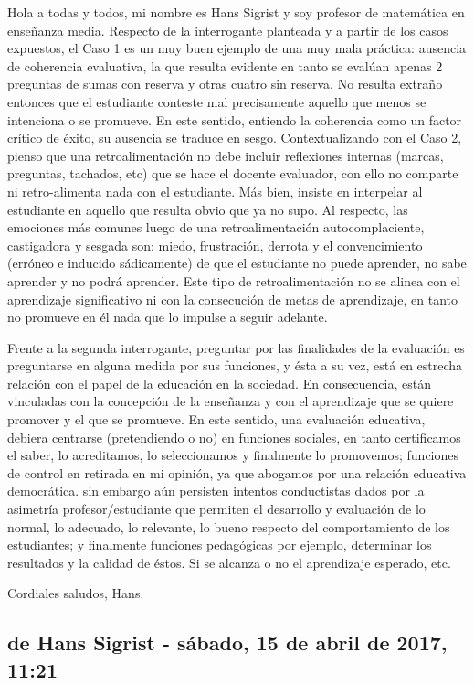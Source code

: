 \documentclass[12pt,letterpaper,article,x11names]{memoir}
\begin{document}
Hola a todas y todos, mi nombre es Hans Sigrist y soy profesor de matemática en enseñanza media. Respecto de la interrogante planteada y a partir de los casos expuestos, el Caso 1 es un muy buen ejemplo de una muy mala práctica: ausencia de coherencia evaluativa, la que resulta evidente en tanto se evalúan apenas 2 preguntas de sumas con reserva y otras cuatro sin reserva. No resulta extraño entonces que el estudiante conteste mal precisamente aquello que menos se intenciona o se promueve. En este sentido, entiendo la coherencia como un factor crítico de éxito, su ausencia se traduce en sesgo. Contextualizando con el Caso 2, pienso que una retroalimentación no debe incluir reflexiones internas (marcas, preguntas, tachados, etc) que se hace el docente evaluador, con ello no comparte ni retro-alimenta nada con el estudiante. Más bien, insiste en interpelar al estudiante en aquello que resulta obvio que ya no supo. Al respecto, las emociones más comunes luego de una retroalimentación autocomplaciente, castigadora y sesgada son: miedo, frustración, derrota y el convencimiento (erróneo e inducido sádicamente) de que el estudiante no puede aprender, no sabe aprender y no podrá aprender. Este tipo de retroalimentación no se alinea con el aprendizaje significativo ni con la consecución de metas de aprendizaje, en tanto no promueve en él nada que lo impulse a seguir adelante. 

Frente a la segunda interrogante, preguntar por las finalidades de la evaluación es preguntarse en alguna medida por sus funciones, y ésta a su vez, está en estrecha relación con el papel de la educación en la sociedad. En consecuencia, están vinculadas con la concepción de la enseñanza y con el aprendizaje que se quiere promover y el que se promueve. En este sentido, una evaluación educativa, debiera centrarse (pretendiendo o no) en funciones sociales, en tanto certificamos el saber, lo acreditamos, lo seleccionamos y finalmente lo promovemos; funciones de control en retirada en mi opinión, ya que abogamos por una relación educativa democrática. sin embargo aún persisten intentos conductistas dados por la asimetría profesor/estudiante que permiten el desarrollo y evaluación de lo normal, lo adecuado, lo relevante, lo bueno respecto del comportamiento de los estudiantes; y finalmente funciones pedagógicas por ejemplo, determinar los resultados y la calidad de éstos. Si se alcanza o no el aprendizaje esperado, etc.

Cordiales saludos, Hans.

\subsection{de Hans Sigrist - sábado, 15 de abril de 2017, 11:21}
\label{sec:org42cb2b9}
\end{document}
